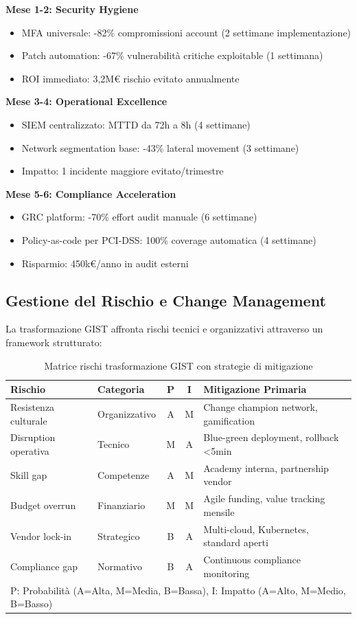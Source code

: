 \textbf{Mese 1-2: Security Hygiene}
\begin{itemize}
\item MFA universale: -82\% compromissioni account (2 settimane implementazione)
\item Patch automation: -67\% vulnerabilità critiche exploitable (1 settimana)
\item ROI immediato: 3,2M€ rischio evitato annualmente
\end{itemize}

\textbf{Mese 3-4: Operational Excellence}
\begin{itemize}
\item SIEM centralizzato: MTTD da 72h a 8h (4 settimane)
\item Network segmentation base: -43\% lateral movement (3 settimane)
\item Impatto: 1 incidente maggiore evitato/trimestre
\end{itemize}

\textbf{Mese 5-6: Compliance Acceleration}
\begin{itemize}
\item GRC platform: -70\% effort audit manuale (6 settimane)
\item Policy-as-code per PCI-DSS: 100\% coverage automatica (4 settimane)
\item Risparmio: 450k€/anno in audit esterni
\end{itemize}

\subsection{\texorpdfstring{Gestione del Rischio e Change Management}{5.4.3 - Risk e Change}}
\label{subsec:5.4.3}

La trasformazione GIST affronta rischi tecnici e organizzativi attraverso un framework strutturato:

\begin{table}[htbp]
\centering
\caption{Matrice rischi trasformazione GIST con strategie di mitigazione}
\label{tab:risk_mitigation}
\begin{tabular}{@{}llccl@{}}
\toprule
\textbf{Rischio} & \textbf{Categoria} & \textbf{P} & \textbf{I} & \textbf{Mitigazione Primaria} \\
\midrule
Resistenza culturale & Organizzativo & A & M & Change champion network, gamification \\
Disruption operativa & Tecnico & M & A & Blue-green deployment, rollback <5min \\
Skill gap & Competenze & A & M & Academy interna, partnership vendor \\
Budget overrun & Finanziario & M & M & Agile funding, value tracking mensile \\
Vendor lock-in & Strategico & B & A & Multi-cloud, Kubernetes, standard aperti \\
Compliance gap & Normativo & B & A & Continuous compliance monitoring \\
\bottomrule
\multicolumn{5}{l}{\footnotesize P: Probabilità (A=Alta, M=Media, B=Bassa), I: Impatto (A=Alto, M=Medio, B=Basso)}
\end{tabular}
\end{table}

